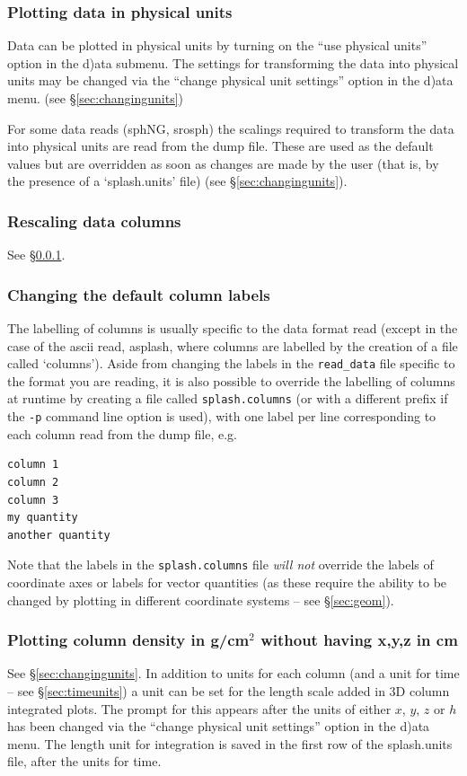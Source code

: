 \documentclass[a4paper,10pt]{article}
\begin{document}
\subsubsection{ Plotting data in physical units}
\label{sec:physicalunits}
 Data can be plotted in physical units by turning on the ``use physical units'' option in the d)ata submenu. The settings for transforming the data into physical units may be changed via the ``change physical unit settings'' option in the d)ata menu. (see \S\ref{sec:changingunits})

 For some data reads (sphNG, srosph) the scalings required to transform the data into physical units are read from the dump file. These are used as the default values but are overridden as soon as changes are made by the user (that is, by the presence of a `splash.units' file) (see \S\ref{sec:changingunits}).
 
\subsubsection{ Rescaling data columns}
See \S\ref{sec:physicalunits}.

\subsubsection{ Changing the default column labels}
\label{sec:columnsfile}
 The labelling of columns is usually specific to the data format read (except in the case of the ascii read, asplash, where columns are labelled by the creation of a file called `columns'). Aside from changing the labels in the \verb+read_data+ file specific to the format you are reading, it is also possible to override the labelling of columns at runtime by creating a file called \verb+splash.columns+ (or with a different prefix if the \verb+-p+ command line option is used), with one label per line corresponding to each column read from the dump file, e.g.
\begin{verbatim}
column 1
column 2
column 3
my quantity
another quantity
\end{verbatim}
Note that the labels in the \verb+splash.columns+ file \emph{will not} override the labels of coordinate axes or labels for vector quantities (as these require the ability to be changed by plotting in different coordinate systems -- see \S\ref{sec:geom}).
 
\subsubsection{ Plotting column density in g/cm$^{2}$ without having x,y,z in cm}
See \S\ref{sec:changingunits}. In addition to units for each column (and a unit for time -- see \S\ref{sec:timeunits}) a unit can be set for the length scale added in 3D column integrated plots. The prompt for this appears after the units of either $x$, $y$, $z$ or $h$ has been changed via the ``change physical unit settings'' option in the d)ata menu. The length unit for integration is saved in the first row of the splash.units file, after the units for time.
\end{document}

